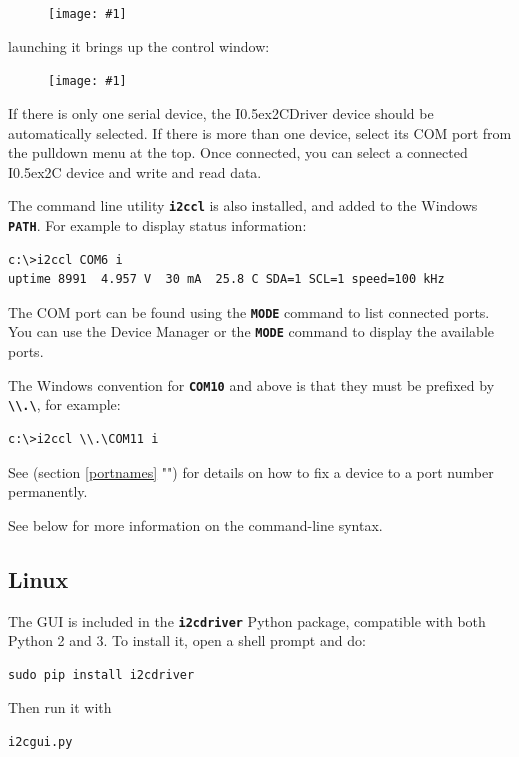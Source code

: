 \documentclass{article}
\newcommand{\two}{\raise0.5ex\hbox{\footnotesize{2}}}
\newcommand{\iic}{I\two{}C}
\newcommand{\iicdriver}{I\two{}CDriver}
\newcommand{\pngw}[2]{
\begin{figure}[H]
\begin{center}
\texttt{[image: \#1]}
\end{center}
\end{figure}
}
\newcommand{\mach}[1]{\texttt{\textbf{#1}}}
\begin{document}
\pngw{img/i2cdriver/win32-icon}{.3}

launching it brings up the control window:

\pngw{img/i2cdriver/win32-gui}{1.0}

If there is only one serial device, 
the \iicdriver{} device should be automatically selected.
If there is more than one device, select its COM port from the pulldown menu at the top.
Once connected, you can select a connected \iic{} device and write and read data. 

The command line utility \mach{i2ccl} is also installed,
and added to the Windows \mach{PATH}.
For example to display status information:

\begin{lstlisting}
c:\>i2ccl COM6 i
uptime 8991  4.957 V  30 mA  25.8 C SDA=1 SCL=1 speed=100 kHz
\end{lstlisting}

The COM port can be found using the \mach{MODE} command to list connected ports. 
You can use the Device Manager or the \mach{MODE} command to display the available ports.

The Windows convention for \mach{COM10} and above is that they must be prefixed by
\mach{\textbackslash\textbackslash.\textbackslash},
for example:  

\begin{lstlisting}
c:\>i2ccl \\.\COM11 i
\end{lstlisting}

See (section \ref{portnames} "") for details on how to fix a device to a port number permanently.

See below for more information on the command-line syntax.

\subsection{Linux}

The GUI is included in the \mach{i2cdriver} Python package, compatible with both Python 2 and 3.
To install it, open a shell prompt and do:

\begin{lstlisting}
sudo pip install i2cdriver
\end{lstlisting}

Then run it with

\begin{lstlisting}
i2cgui.py
\end{lstlisting}
\end{document}
